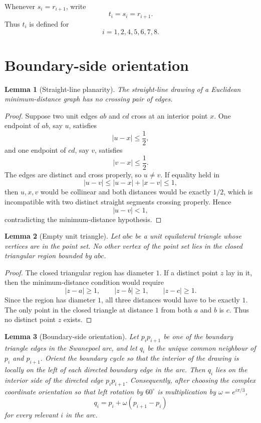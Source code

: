 \documentclass[11pt]{article}
\theoremstyle{plain}
\newtheorem{lemma}{Lemma}
\numberwithin{equation}{section}
\begin{document}
Whenever $s_i=r_{i+1}$, write
\[
 t_i=s_i=r_{i+1}.
\]
Thus $t_i$ is defined for
\[
 i=1,2,4,5,6,7,8.
\]


\section{Boundary-side orientation}

\begin{lemma}[Straight-line planarity]\label{lem:straight-planar}
The straight-line drawing of a Euclidean minimum-distance graph has no crossing pair of edges.
\end{lemma}

\begin{proof}
Suppose two unit edges $ab$ and $cd$ cross at an interior point $x$. One endpoint of $ab$, say $u$, satisfies
\[
 |u-x|\le \frac12,
\]
and one endpoint of $cd$, say $v$, satisfies
\[
 |v-x|\le \frac12.
\]
The edges are distinct and cross properly, so $u\ne v$. If equality held in
\[
 |u-v|\le |u-x|+|x-v|\le1,
\]
then $u,x,v$ would be collinear and both distances would be exactly $1/2$, which is incompatible with two distinct straight segments crossing properly. Hence
\[
 |u-v|<1,
\]
contradicting the minimum-distance hypothesis.
\end{proof}

\begin{lemma}[Empty unit triangle]\label{lem:empty-triangle}
Let $abc$ be a unit equilateral triangle whose vertices are in the point set. No other vertex of the point set lies in the closed triangular region bounded by $abc$.
\end{lemma}

\begin{proof}
The closed triangular region has diameter $1$. If a distinct point $z$ lay in it, then the minimum-distance condition would require
\[
 |z-a|\ge1,
 \qquad |z-b|\ge1,
 \qquad |z-c|\ge1.
\]
Since the region has diameter $1$, all three distances would have to be exactly $1$. The only point in the closed triangle at distance $1$ from both $a$ and $b$ is $c$. Thus no distinct point $z$ exists.
\end{proof}

\begin{lemma}[Boundary-side orientation]\label{lem:boundary-side}
Let $p_ip_{i+1}$ be one of the boundary triangle edges in the Swanepoel arc, and let $q_i$ be the unique common neighbour of $p_i$ and $p_{i+1}$. Orient the boundary cycle so that the interior of the drawing is locally on the left of each directed boundary edge in the arc. Then $q_i$ lies on the interior side of the directed edge $p_ip_{i+1}$. Consequently, after choosing the complex coordinate orientation so that left rotation by $60^\circ$ is multiplication by $\omega=e^{i\pi/3}$,
\[
 q_i=p_i+\omega(p_{i+1}-p_i)
\]
for every relevant $i$ in the arc.
\end{lemma}
\end{document}
